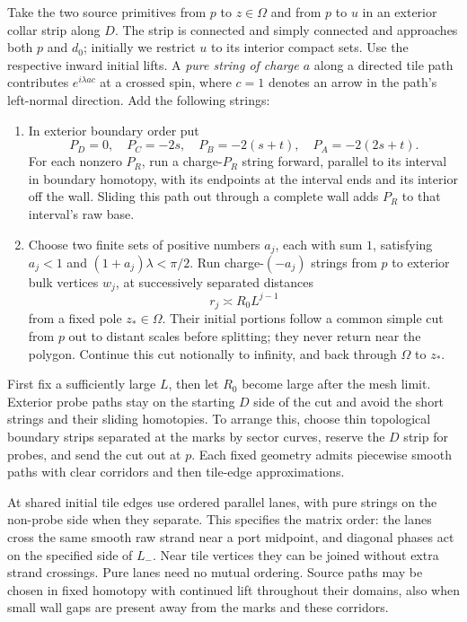 Take the two source primitives from $p$ to $z\in\Omega$ and from $p$
to $u$ in an exterior collar strip along $D$.  The strip is connected
and simply connected and approaches both $p$ and $d_0$; initially
we restrict $u$ to its interior compact sets.  Use the respective
inward initial lifts.  A \emph{pure string of charge $a$} along a
directed tile path contributes $e^{i\lambda ac}$ at a crossed spin,
where $c=1$ denotes an arrow in the path's left-normal direction.
Add the following strings:
\begin{enumerate}[label=(\roman*),leftmargin=*]
\item In exterior boundary order put
\begin{equation}
 P_D=0,\quad P_C=-2s,\quad P_B=-2(s+t),\quad P_A=-2(2s+t).
 \label{wall:short-charges}
\end{equation}
For each nonzero $P_R$, run a charge-$P_R$ string forward, parallel
to its interval in boundary homotopy, with its endpoints at the interval
ends and its interior off the wall.  Sliding this path out through a
complete wall adds $P_R$ to that interval's raw base.
\item Choose two finite sets of positive numbers $a_j$, each with sum
$1$, satisfying $a_j<1$ and $(1+a_j)\lambda<\pi/2$.
Run charge-$(-a_j)$ strings from $p$ to exterior bulk vertices $w_j$,
at successively separated distances
\begin{equation}
 r_j\asymp R_0L^{j-1}
 \label{wall:distant-scales}
\end{equation}
from a fixed pole $z_*\in\Omega$.  Their initial portions follow a
common simple cut from $p$ out to distant scales before splitting;
they never return near the polygon.  Continue this cut notionally to
infinity, and back through $\Omega$ to $z_*$.
\end{enumerate}
First fix a sufficiently large $L$, then let $R_0$ become large after
the mesh limit.  Exterior probe paths stay on the starting $D$ side
of the cut and avoid the short strings and their sliding homotopies.
To arrange this, choose thin topological boundary strips separated
at the marks by sector curves, reserve the $D$ strip for probes, and
send the cut out at $p$.  Each fixed geometry admits piecewise smooth
paths with clear corridors and then tile-edge approximations.

At shared initial tile edges use ordered parallel lanes, with pure
strings on the non-probe side when they separate.  This specifies the
matrix order: the lanes cross the same smooth raw strand near a port
midpoint, and diagonal phases act on the specified side of $L_-$.
Near tile vertices they can be joined without extra strand crossings.
Pure lanes need no mutual ordering.  Source paths may be chosen in
fixed homotopy with continued lift throughout their domains, also when
small wall gaps are present away from the marks and these corridors.

